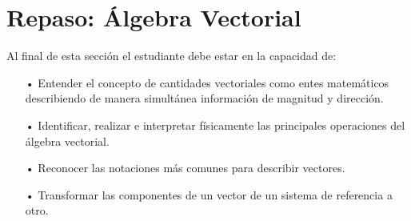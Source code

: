 \chapter{Repaso: Álgebra Vectorial}

Al final de esta sección el estudiante debe estar en la capacidad de:
\begin{itemize}
\item[•] Entender el concepto de cantidades vectoriales como entes matemáticos describiendo de manera simultánea información de magnitud y dirección.
\item[•] Identificar, realizar e interpretar físicamente las principales operaciones del álgebra vectorial.
\item[•] Reconocer las notaciones más comunes para describir vectores.
\item[•] Transformar las componentes de un vector de un sistema de referencia a otro.
\end{itemize}
